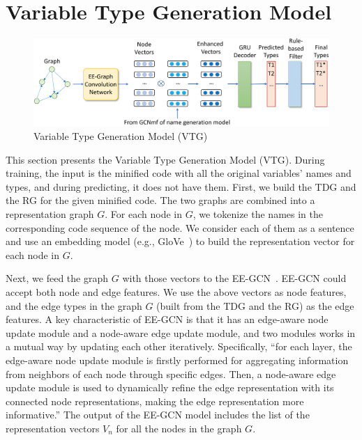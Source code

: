 \section{Variable Type Generation Model}
\label{sec:type-gen}

\begin{figure}[ht]
	\begin{center}
	  \includegraphics[width=5in]{figures/type-gen-model}
          \vspace{-6pt}
		\caption{Variable Type Generation Model (VTG)}
		\label{fig:type-gen}
	\end{center}
\end{figure}

This section presents the Variable Type Generation Model (VTG). During
training, the input is the minified code with all the original
variables’ names and types, and during predicting, it does not have
them. First, we build the TDG and the RG for the given minified code.
The two graphs are combined into a representation graph $G$. For each
node in $G$, we tokenize the names in the corresponding code sequence
of the node. We consider each of them as a sentence and use an
embedding model (e.g., GloVe~\cite{pennington2014glove}) to build the
representation vector for each node in $G$.

Next, we feed the graph $G$ with those vectors to the
EE-GCN~\cite{ee-gcn}. EE-GCN could accept both node and edge features.
We use the above vectors as node features, and the edge types in the
graph $G$ (built from the TDG and the RG) as the edge features. A key
characteristic of EE-GCN is that it has an edge-aware node update
module and a node-aware edge update module, and two modules works in a
mutual way by updating each other iteratively. Specifically, ``for
each layer, the edge-aware node update module is firstly performed for
aggregating information from neighbors of each node through specific
edges. Then, a node-aware edge update module is used to dynamically
refine the edge representation with its connected node
representations, making the edge representation more informative.''
The output of the EE-GCN model includes the list of the representation
vectors $V_n$ for all the nodes in the graph $G$.


